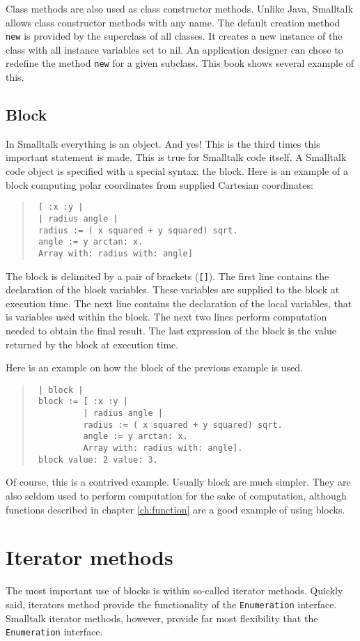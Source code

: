 \documentclass[twoside]{book}
\begin{document}
Class methods are also used as class constructor methods. Unlike
Java, Smalltalk allows class constructor methods with any name.
The default creation method {\tt new} is provided by the
superclass of all classes. It creates a new instance of the class
with all instance variables set to nil. An application designer
can chose to redefine the method {\tt new} for a given subclass.
This book shows several example of this.

\subsection{Block}
In Smalltalk everything is an object. And yes! This is the third
times this important statement is made. This is true for Smalltalk
code itself. A Smalltalk code object is specified with a special
syntax: the block. Here is an example of a block
computing polar coordinates from supplied Cartesian coordinates:
\begin{quote}
\begin{verbatim}
 [ :x :y |
 | radius angle |
 radius := ( x squared + y squared) sqrt.
 angle := y arctan: x.
 Array with: radius with: angle]
\end{verbatim}
\end{quote}
The block  is delimited by a pair of brackets ({\tt []}).
The first line contains the declaration of the block variables.
These variables are supplied to the block  at execution
time. The next line contains the declaration of the local
variables, that is variables used within the block. The next two
lines perform computation needed to obtain the final result. The
last expression of the block  is the value returned by the
block  at execution time.

Here is an example on how the block of the previous example is
used.
\begin{quote}
\begin{verbatim}
 | block |
 block := [ :x :y |
          | radius angle |
          radius := ( x squared + y squared) sqrt.
          angle := y arctan: x.
          Array with: radius with: angle].
 block value: 2 value: 3.
\end{verbatim}
\end{quote}
Of course, this is a contrived example. Usually block  are
much simpler. They are also seldom used to perform computation for
the sake of computation, although functions described in chapter
\ref{ch:function} are a good example of using blocks.

\section{Iterator methods}
\label{sec:iterator} The most important use of blocks is
within so-called iterator methods. Quickly said, iterators method
provide the functionality of the {\tt Enumeration} interface.
Smalltalk iterator methods, however, provide far most flexibility
that the {\tt Enumeration} interface.
\end{document}
